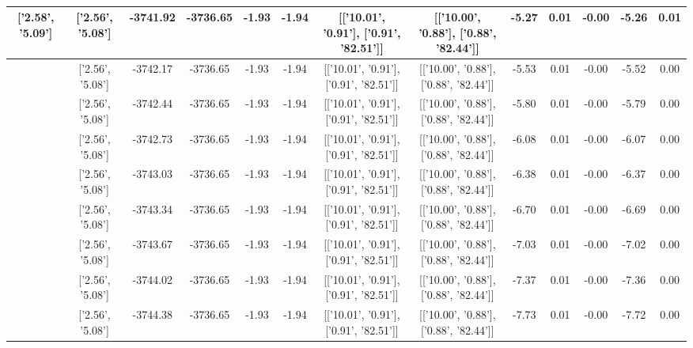 \begin{table}[htbp]
\begin{adjustbox}{angle=90}
\begin{tabular}{|c|c|c|c|c|c|c|c|c|c|c|c|c|}
 ['2.58', '5.09'] & ['2.56', '5.08'] & -3741.92 & -3736.65 & -1.93 & -1.94 & [['10.01', '0.91'], ['0.91', '82.51']] & [['10.00', '0.88'], ['0.88', '82.44']] & -5.27 & 0.01 & -0.00 & -5.26 & 0.01\\ \hline
 ['2.58', '5.09'] & ['2.56', '5.08'] & -3742.17 & -3736.65 & -1.93 & -1.94 & [['10.01', '0.91'], ['0.91', '82.51']] & [['10.00', '0.88'], ['0.88', '82.44']] & -5.53 & 0.01 & -0.00 & -5.52 & 0.00\\ \hline
 ['2.59', '5.09'] & ['2.56', '5.08'] & -3742.44 & -3736.65 & -1.93 & -1.94 & [['10.01', '0.91'], ['0.91', '82.51']] & [['10.00', '0.88'], ['0.88', '82.44']] & -5.80 & 0.01 & -0.00 & -5.79 & 0.00\\ \hline
 ['2.59', '5.09'] & ['2.56', '5.08'] & -3742.73 & -3736.65 & -1.93 & -1.94 & [['10.01', '0.91'], ['0.91', '82.51']] & [['10.00', '0.88'], ['0.88', '82.44']] & -6.08 & 0.01 & -0.00 & -6.07 & 0.00\\ \hline
 ['2.59', '5.09'] & ['2.56', '5.08'] & -3743.03 & -3736.65 & -1.93 & -1.94 & [['10.01', '0.91'], ['0.91', '82.51']] & [['10.00', '0.88'], ['0.88', '82.44']] & -6.38 & 0.01 & -0.00 & -6.37 & 0.00\\ \hline
 ['2.59', '5.09'] & ['2.56', '5.08'] & -3743.34 & -3736.65 & -1.93 & -1.94 & [['10.01', '0.91'], ['0.91', '82.51']] & [['10.00', '0.88'], ['0.88', '82.44']] & -6.70 & 0.01 & -0.00 & -6.69 & 0.00\\ \hline
 ['2.59', '5.09'] & ['2.56', '5.08'] & -3743.67 & -3736.65 & -1.93 & -1.94 & [['10.01', '0.91'], ['0.91', '82.51']] & [['10.00', '0.88'], ['0.88', '82.44']] & -7.03 & 0.01 & -0.00 & -7.02 & 0.00\\ \hline
 ['2.59', '5.09'] & ['2.56', '5.08'] & -3744.02 & -3736.65 & -1.93 & -1.94 & [['10.01', '0.91'], ['0.91', '82.51']] & [['10.00', '0.88'], ['0.88', '82.44']] & -7.37 & 0.01 & -0.00 & -7.36 & 0.00\\ \hline
 ['2.59', '5.09'] & ['2.56', '5.08'] & -3744.38 & -3736.65 & -1.93 & -1.94 & [['10.01', '0.91'], ['0.91', '82.51']] & [['10.00', '0.88'], ['0.88', '82.44']] & -7.73 & 0.01 & -0.00 & -7.72 & 0.00\\ \hline
            \end{tabular}
        \end{adjustbox}
        \caption{}
        \label{}
    \end{table}
    